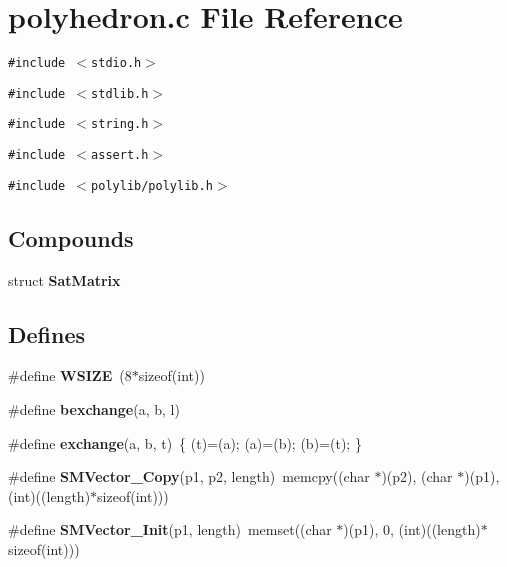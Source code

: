 \section{polyhedron.c File Reference}
\label{polyhedron_8c}
{\tt \#include $<$stdio.h$>$}\par
{\tt \#include $<$stdlib.h$>$}\par
{\tt \#include $<$string.h$>$}\par
{\tt \#include $<$assert.h$>$}\par
{\tt \#include $<$polylib/polylib.h$>$}\par
\subsection*{Compounds}
\begin{CompactItemize}
\item 
struct {\bf Sat\-Matrix}
\end{CompactItemize}
\subsection*{Defines}
\begin{CompactItemize}
\item 
\#define {\bf WSIZE}\ (8$\ast$sizeof(int))
\item 
\#define {\bf bexchange}(a, b, l)
\item 
\#define {\bf exchange}(a, b, t)\ \{ (t)=(a); (a)=(b); (b)=(t); \}
\item 
\#define {\bf SMVector\_\-Copy}(p1, p2, length)\ memcpy((char $\ast$)(p2), (char $\ast$)(p1), (int)((length)$\ast$sizeof(int)))
\item 
\#define {\bf SMVector\_\-Init}(p1, length)\ memset((char $\ast$)(p1), 0, (int)((length)$\ast$sizeof(int)))
\end{CompactItemize}

